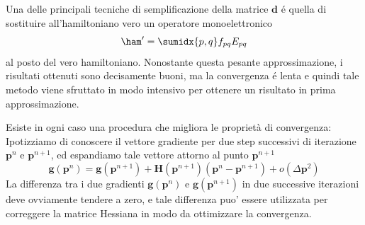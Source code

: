 Una delle principali tecniche di semplificazione della matrice
$\mathbf{d}$ \'e quella di sostituire all'hamiltoniano vero un operatore
monoelettronico
$$
\ham^{\prime} = \sumidx{p,q}f_{pq} E_{pq}
$$
al posto del vero hamiltoniano. Nonostante questa pesante
approssimazione, i risultati ottenuti sono decisamente buoni, ma la
convergenza \'e lenta e quindi tale metodo viene sfruttato in modo
intensivo per ottenere un risultato in prima approssimazione.

Esiste in ogni caso una procedura che migliora le propriet\`a di
convergenza: Ipotizziamo di conoscere il vettore gradiente per due step
successivi di iterazione $\mathbf{p}^{n} $ e $\mathbf{p}^{n+1}$, ed espandiamo 
tale vettore attorno al punto $\mathbf{p}^{n+1}$
$$
\mathbf{g}\left(\mathbf{p}^{n}\right) =
\mathbf{g}\left(\mathbf{p}^{n+1}\right) +
\mathbf{H}\left(\mathbf{p}^{n+1}\right) \left(\mathbf{p}^{n} -
\mathbf{p}^{n+1}\right) + o(\Delta\mathbf{p}^2)
$$
La differenza tra i due gradienti
$\mathbf{g}\left(\mathbf{p}^{n}\right)$
e $\mathbf{g}\left(\mathbf{p}^{n+1}\right)$ in due successive
iterazioni deve ovviamente tendere a zero, e tale differenza puo'
essere utilizzata per correggere la matrice Hessiana in modo da
ottimizzare la convergenza.


